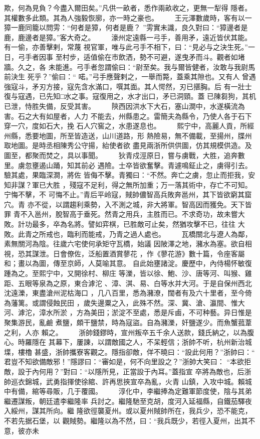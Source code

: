 \documentclass{ctexart}
\begin{document}
欺，何為見負？今盡入爾田矣。''凡供一畝者，悉作兩畝收之，更無一犁得 隱者。其權數多此類。其為人強毅恢廓，亦一時之豪也。 　　王元澤數歲時，客有以一獐一鹿同籠以問雱：``何者是獐，何者是鹿？ ''雱實未識，良久對曰：``獐邊者是鹿，鹿邊者是獐。''客大奇之。 　　濠州定遠縣一弓手，善用矛，遠近皆伏其能。有一偷，亦善擊剌，常蔑 視官軍，唯与此弓手不相下，曰：``見必与之決生死。''一日，弓手者因事 至村步，适值偷在市飲洒，勢不可避，遂曳矛而斗。觀者如堵牆。久之，各 未能進。弓手者忽謂偷曰：``尉至矣。我与爾皆健者，汝敢与我尉馬前決生 死乎？''偷曰：`` 喏。''弓手應聲剌之，一舉而斃，蓋乘其隙也。又有人 曾遇強寇斗，矛刃方接，寇先含水滿口，噀其面。其人愕然，刃已揕胸。后 有一壯士復与寇遇，已先知□水之事。寇復用之，水才出口，矛已洞頸。蓋 已陳芻狗，其机已泄，恃胜失備，反受其害。 　　陝西因洪水下大石，塞山澗中，水遂橫流為害。石之大有如屋者，人力 不能去，州縣患之。雷簡夫為縣令，乃使人各于石下穿一穴，度如石大，挽 石人穴窖之，水患遂息也。 　　熙宁中，高麗人貢，所經州縣，悉要地圖，所至皆造送，山川道路，形 熱險易，無不備載，至揚州，牒州取地圖。是時丞相陳秀公守揚，紿使者欲 盡見兩浙所供供圖，仿其規模供造。及圖至，都聚而焚之，具以事聞。 　　狄青戍涇原日，嘗与虜戰，大胜，追奔數里。虜忽壅遏山踊，知其前必 遇險。士卒皆欲奮擊。青遽鳴鉦止之，虜得引去。驗其處，果臨深澗，將佐 皆侮不擊。青獨曰：``不然。奔亡之虜，忽止而拒我，安知非謀？軍已大胜 ，殘寇不足利，得之無所加重；万一落其術中，存亡不可知。宁悔不擊，不 可悔不止。''青后平岭寇，賊帥儂智高兵敗奔邕州，其下皆欲窮其窟穴。青 亦不從，以謂趨利乘勢，入不測之城，非大將軍。智高因而獲免。天下皆罪 青不入邕州，脫智高于垂死。然青之用兵，主胜而已。不求奇功，故未嘗大 敗。計功最多，卒為名將。譬如弈棋，已胜敵可止矣，然猶攻擊不已，往往 大敗。此青之所戒也，臨利而能戒，乃青之過人處也。 　　瓦橋關北与遼人為鄰，素無關河為陰。往歲六宅使何承矩守瓦橋，始議 因陂澤之地，瀦水為塞。欲自相視，恐其謀泄。日會僚佐，泛船置酒賞蓼花 ，作《蓼花游》數十篇，令座客屬和；畫以為圖，傳至京師，人莫喻其意。 自此始壅諸淀。慶歷中，內侍楊怀敏復踵為之。至熙宁中，又開徐村、柳庄 等濼，皆以徐、鮑、沙、唐等河、叫猴、雞距、五眼等泉為之原，東合滹沱 、漳、淇、易、白等水并大河。于是自保州西北沈遠濼，東盡滄州泥枯海口 ，几八百里，悉為瀦潦，闊者有及六十里者，至今倚為藩篱。或謂侵蝕民田 ，歲失邊粟之入，此殊不然。深、冀、滄、瀛間、惟大河、滹沱，漳水所淤 ，方為美田；淤淀不至處，悉是斥鹵，不可种藝。异日惟是聚集游民，亂鹼 煮鹽，頗干鹽禁，時為寇盜。自為瀦濼，奸鹽遂少。而魚蟹菰葦之利，人亦 賴之。 　　浙帥錢鏐時，宣州叛卒五千余人送款，錢氏納之，以為腹心。時羅隱在 其幕下，屢諫，以謂敵國之人，不呆輕信；浙帥不听，杭州新治城堞，樓櫓 甚盛，浙帥攜寮客觀之。隱指卻敵，佯不曉曰：``設此何用？''浙帥曰：`` 君豈不知欲備敵邪！''隱謬曰：``審如是，何不向里設之？''浙帥大笑曰： ``本欲拒敵，設于內何用？''對曰：``以隱所見，正當設于內耳。''蓋指宣 卒將為敵也，后浙帥巡衣錦城，武勇指揮使徐綰、許再思挾宣卒為亂，火青 山鎮，入攻中城。賴城中有備，綰等尋販，几于覆國。 　　淳化中，李繼捧為定難軍節度使，陰与其弟繼遷謀叛，朝廷遣李繼隆率 兵討之。繼隆馳至克胡，度河入延福縣，自鐵茄驛夜入綏州，謀其所向。繼 隆欲徑襲夏州。或以夏州賊帥所在，我兵少，恐不能克，不若先据石堡，以 觀賊勢。繼隆以為不然，曰：``我兵既少，若徑入夏州，出其不意，彼亦未 
\end{document}
